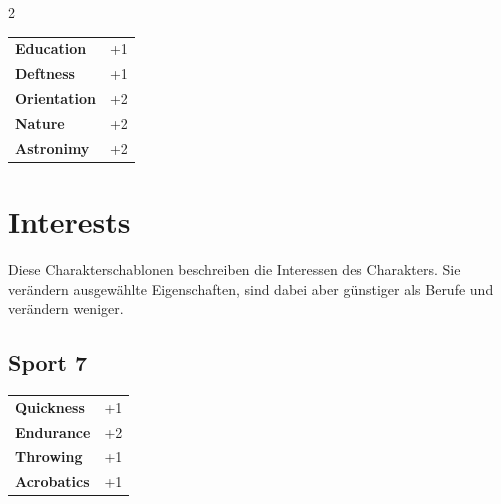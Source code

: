 \begin{multicols}{2}
\begin{tcolorbox}
\begin{tabular}{@{}ll@{}}
    \textbf{Education} & +1\\
    \textbf{Deftness} & +1\\
    \textbf{Orientation} & +2\\
    \textbf{Nature} & +2\\
    \textbf{Astronimy} & +2\\
\end{tabular}


\end{tcolorbox}

\section{Interests}

Diese Charakterschablonen beschreiben die Interessen des Charakters. Sie verändern ausgewählte Eigenschaften, sind dabei aber günstiger als Berufe und verändern weniger.

\begin{tcolorbox}
    \subsection*{Sport \hfill \small{7 }}
    \tcblower




\begin{tabular}{@{}ll@{}}
    \textbf{Quickness} & +1\\
    \textbf{Endurance} & +2\\
    \textbf{Throwing} & +1\\
    \textbf{Acrobatics} & +1\\
\end{tabular}



\end{tcolorbox}
\end{multicols}
